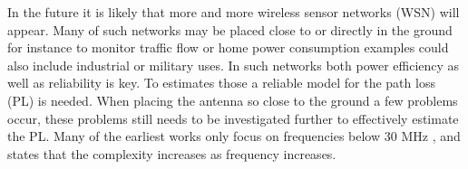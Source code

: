 
In the future it is likely that more and more wireless sensor networks (WSN) will appear. Many of such networks may be placed close to or directly in the ground for instance to monitor traffic flow or home power consumption examples could also include industrial or military uses. In such networks both power efficiency as well as reliability is key. To estimates those a reliable model for the path loss (PL) is needed. When placing the antenna so close to the ground a few problems occur, these problems still needs to be investigated further to effectively estimate the PL. Many of the earliest works only focus on frequencies below 30 MHz \cite{Bullington}, and states that the complexity increases as frequency increases. 


